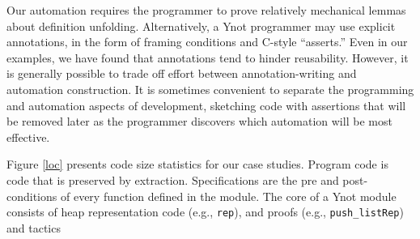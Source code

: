 \documentclass[preprint,nocopyrightspace]{sigplanconf}
\newcommand{\cd}[1]{\texttt{#1}}
\begin{document}
Our automation requires the programmer to prove relatively mechanical
lemmas about definition unfolding.  Alternatively, a Ynot programmer may use
explicit annotations, in the form of framing conditions and C-style
``asserts.''  Even in our examples, we have found that annotations
tend to hinder reusability.  However, it is generally possible to
trade off effort between annotation-writing and automation
construction.  It is sometimes convenient to separate the programming
and automation aspects of development, sketching code with assertions
that will be removed later as the programmer discovers which
automation will be most effective.

Figure \ref{loc} presents code size statistics for our case studies.
Program code is code that is preserved by extraction.
Specifications are the pre and post-conditions of every function
defined in the module.  The core of a Ynot module consists of heap representation code
(e.g., \cd{rep}), and proofs (e.g., \cd{push\_listRep}) and tactics
\end{document}
